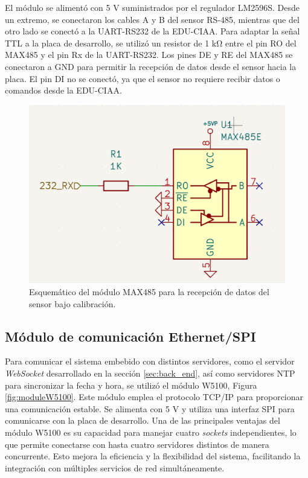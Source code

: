  El módulo se alimentó con 5 \unit{\volt} suministrados por el regulador LM2596S. Desde un extremo, se conectaron los cables A y B del sensor RS-485, mientras que del otro lado se conectó a la UART-RS232 de la EDU-CIAA. Para adaptar la señal TTL a la placa de desarrollo, se utilizó un resistor de 1 \unit{\kilo\ohm} entre el pin RO del MAX485 y el pin Rx de la UART-RS232. Los pines DE y RE del MAX485 se conectaron a GND para permitir la recepción de datos desde el sensor hacia la placa. El pin DI no se conectó, ya que el sensor no requiere recibir datos o comandos desde la EDU-CIAA.

\begin{figure}[H]
    \centering
    \includegraphics[width=0.5\linewidth]{Figuras/datalogger/Hardware/esquemRS485.png}
    \caption{Esquemático del módulo MAX485 para la recepción de datos del sensor bajo calibración.}
    \label{fig:esquemRS485}
\end{figure}


\subsection{Módulo de comunicación Ethernet/SPI  }\label{sec:moduloEthernet}

Para comunicar el sistema embebido con distintos servidores, como el servidor \textit{WebSocket} desarrollado en la sección \ref{sec:back_end}, así como servidores NTP para sincronizar la fecha y hora, se utilizó el módulo W5100, Figura \ref{fig:moduleW5100}. Este módulo emplea el protocolo TCP/IP para proporcionar una comunicación estable. Se alimenta con 5 \unit{\volt} y utiliza una interfaz SPI para comunicarse con la placa de desarrollo. Una de las principales ventajas del módulo W5100 \cite{W5100Datasheet} es su capacidad para manejar cuatro \textit{sockets} independientes, lo que permite conectarse con hasta cuatro servidores distintos de manera concurrente. Esto mejora la eficiencia y la flexibilidad del sistema, facilitando la integración con múltiples servicios de red simultáneamente.



